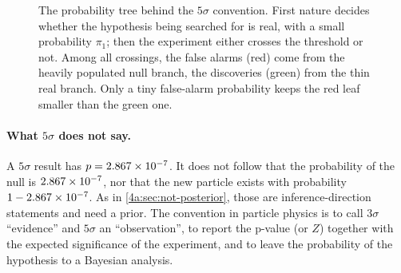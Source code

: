 \begin{figure}[htbp]
\centering
{}
\caption{The probability tree behind the $5\sigma$ convention. First nature
decides whether the hypothesis being searched for is real, with a small
probability $\pi_1$; then the experiment either crosses the threshold or not.
Among all crossings, the false alarms (red) come from the heavily populated
null branch, the discoveries (green) from the thin real branch. Only a tiny
false-alarm probability keeps the red leaf smaller than the green one.}
\label{4a:fig:tree}
\end{figure}

\paragraph{What $5\sigma$ does not say.}
A $5\sigma$ result has $p=2.867\times10^{-7}$. It does not follow that the
probability of the null is $2.867\times10^{-7}$, nor that the new particle exists
with probability $1-2.867\times10^{-7}$. As in \cref{4a:sec:not-posterior}, those
are inference-direction statements and need a prior. The convention in
particle physics is to call $3\sigma$ ``evidence'' and $5\sigma$ an
``observation'', to report the p-value (or $Z$) together with the expected
significance of the experiment, and to leave the probability of the hypothesis
to a Bayesian analysis.

